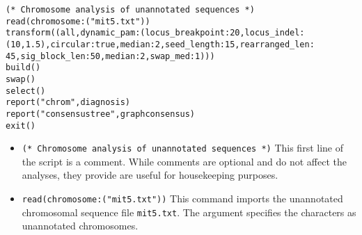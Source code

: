 \begin{verbatim}
(* Chromosome analysis of unannotated sequences *)
read(chromosome:("mit5.txt"))
transform((all,dynamic_pam:(locus_breakpoint:20,locus_indel:
(10,1.5),circular:true,median:2,seed_length:15,rearranged_len:
45,sig_block_len:50,median:2,swap_med:1)))
build()
swap()
select()
report("chrom",diagnosis)
report("consensustree",graphconsensus)
exit()
\end{verbatim}

\begin{itemize}
\item \texttt{(* Chromosome analysis of unannotated sequences *)} This first line of the script is a comment. While comments are optional and do not affect the analyses, they provide are useful for housekeeping purposes.
\item \texttt{read(chromosome:("mit5.txt"))} This command imports the unannotated chromosomal sequence file \texttt{mit5.txt}. The argument  specifies the characters as unannotated chromosomes.

\end{itemize}
